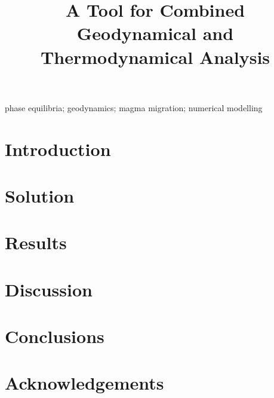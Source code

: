 \documentclass[a4paper]{article}
\title{A Tool for Combined Geodynamical and Thermodynamical Analysis}
\date{}
\begin{document}
\maketitle

\begin{abstract}

\end{abstract}

\begin{keywords}
phase equilibria; geodynamics; magma migration; numerical modelling
\end{keywords}

\section{Introduction}
\label{sec:introduction}


\section{Solution}
\label{sec:solution}


\section{Results}
\label{sec:results}


\section{Discussion}
\label{sec:discussion}


\section{Conclusions}
\label{sec:conclusions}


\section{Acknowledgements}
\label{sec:acknowledgements}


\printbibliography
\end{document}
